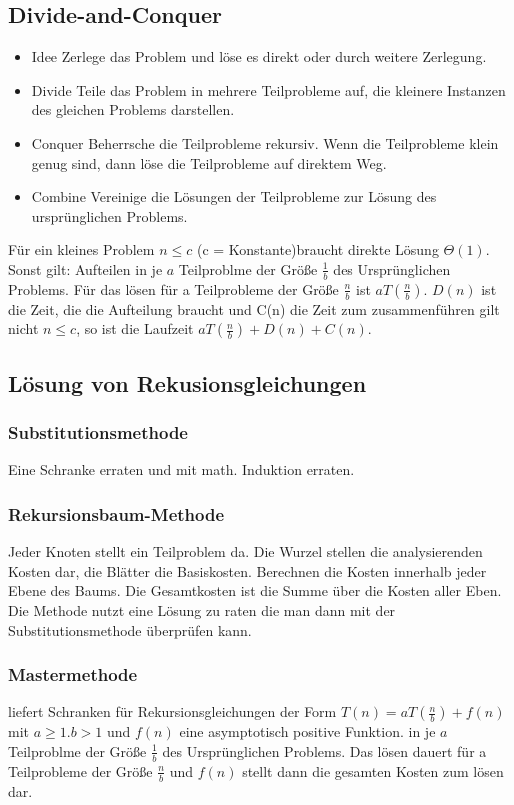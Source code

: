 \documentclass[jou,apacite]{apa6}
\begin{document}
\subsection{Divide-and-Conquer}
\begin{itemize}
    \item Idee Zerlege das Problem und löse es direkt oder durch weitere Zerlegung.
    \item Divide Teile das Problem in mehrere Teilprobleme auf, die kleinere Instanzen des gleichen Problems darstellen.
    \item Conquer Beherrsche die Teilprobleme rekursiv. Wenn die Teilprobleme klein genug sind, dann löse die Teilprobleme auf direktem Weg.
    \item Combine Vereinige die Lösungen der Teilprobleme zur Lösung des ursprünglichen Problems.
\end{itemize}
Für ein kleines Problem $n\le c$ (c = Konstante)braucht direkte Lösung $\Theta(1)$. Sonst gilt: Aufteilen in je $a$ Teilproblme der Größe $\frac{1}{b}$ des Ursprünglichen Problems. Für das lösen für a Teilprobleme der Größe $\frac{n}{b}$ ist $aT(\frac{n}{b})$. $D(n)$ ist die Zeit, die die Aufteilung braucht und C(n) die Zeit zum zusammenführen gilt nicht $n\le c$, so ist die Laufzeit $aT(\frac{n}{b}) + D(n) + C(n)$.

\subsection{Lösung von Rekusionsgleichungen}

\subsubsection{Substitutionsmethode}
Eine Schranke erraten und mit math. Induktion erraten.

\subsubsection{Rekursionsbaum-Methode} 
Jeder Knoten stellt ein Teilproblem da. Die Wurzel stellen die analysierenden Kosten dar, die Blätter die Basiskosten. Berechnen die Kosten innerhalb jeder Ebene des Baums. Die Gesamtkosten ist die Summe über die Kosten aller Eben. Die Methode nutzt eine Lösung zu raten die man dann mit der Substitutionsmethode überprüfen kann.

\subsubsection{Mastermethode} 
liefert Schranken für Rekursionsgleichungen der Form $T(n) = aT(\frac{n}{b})+f(n)$ mit $a\ge 1. b>1$ und $f(n)$ eine asymptotisch positive Funktion. in  je $a$ Teilproblme der Größe $\frac{1}{b}$ des Ursprünglichen Problems. Das lösen dauert für a Teilprobleme der Größe $\frac{n}{b}$ und $f(n)$ stellt dann die gesamten Kosten zum lösen dar.
\end{document}
